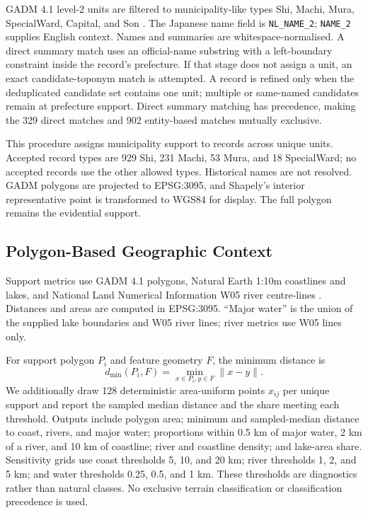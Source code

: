 \documentclass{isprs}
\begin{document}
GADM 4.1 level-2 units are filtered to municipality-like types Shi, Machi, Mura, SpecialWard, Capital, and Son \cite{gadm41}. The Japanese name field is \texttt{NL\_NAME\_2}; \texttt{NAME\_2} supplies English context. Names and summaries are whitespace-normalised. A direct summary match uses an official-name substring with a left-boundary constraint inside the record's prefecture. If that stage does not assign a unit, an exact candidate-toponym match is attempted. A record is refined only when the deduplicated candidate set contains one unit; multiple or same-named candidates remain at prefecture support. Direct summary matching has precedence, making the 329 direct matches and 902 entity-based matches mutually exclusive.

This procedure assigns municipality support to \MunicipalityAnchorRecords{} records across \MunicipalitySupportUnits{} unique units. Accepted record types are 929 Shi, 231 Machi, 53 Mura, and 18 SpecialWard; no accepted records use the other allowed types. Historical names are not resolved. GADM polygons are projected to EPSG:3095, and Shapely's interior representative point is transformed to WGS84 for display. The full polygon remains the evidential support.

\subsection{Polygon-Based Geographic Context}

Support metrics use GADM 4.1 polygons, Natural Earth 1:10m coastlines and lakes, and National Land Numerical Information W05 river centre-lines \cite{gadm41,naturalearth,mlitw05}. Distances and areas are computed in EPSG:3095. ``Major water'' is the union of the supplied lake boundaries and W05 river lines; river metrics use W05 lines only.

For support polygon \(P_i\) and feature geometry \(F\), the minimum distance is
\begin{equation}
d_{\min}(P_i,F)=\min_{x\in P_i,y\in F}\lVert x-y\rVert .
\label{eq:distance}
\end{equation}
We additionally draw 128 deterministic area-uniform points \(x_{ij}\) per unique support and report the sampled median distance and the share meeting each threshold. Outputs include polygon area; minimum and sampled-median distance to coast, rivers, and major water; proportions within 0.5 km of major water, 2 km of a river, and 10 km of coastline; river and coastline density; and lake-area share. Sensitivity grids use coast thresholds 5, 10, and 20 km; river thresholds 1, 2, and 5 km; and water thresholds 0.25, 0.5, and 1 km. These thresholds are diagnostics rather than natural classes. No exclusive terrain classification or classification precedence is used.
\end{document}
